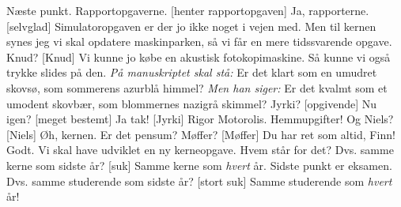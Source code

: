 \documentclass[10pt]{article}
\begin{document}
\begin{sketch}
 Næste punkt. Rapportopgaverne.
 [henter rapportopgaven] Ja, rapporterne.
 [selvglad] Simulatoropgaven er der jo ikke noget i vejen med.
 Men til kernen synes jeg vi skal opdatere maskinparken, så vi
         får en mere tidssvarende opgave. Knud?
 [Knud] Vi kunne jo købe en akustisk fotokopimaskine. Så kunne
         vi også trykke slides på den. \emph{På manuskriptet skal stå:}
         Er det klart som en umudret skovsø, som sommerens azurblå
         himmel? \emph{Men han siger:} Er det kvalmt som et umodent skovbær, som blommernes nazigrå
         skimmel?
 Jyrki?
 [opgivende] Nu igen?
 [meget bestemt] Ja tak!
 [Jyrki] Rigor Motorolis. Hemmupgifter!
 Og Niels?
 [Niels] Øh, kernen. Er det pensum?
 Møffer?
 [Møffer] Du har ret som altid, Finn!
 Godt. Vi skal have udviklet en ny kerneopgave. Hvem står for
         det?
 Dvs. samme kerne som sidste år?
 [suk] Samme kerne som \emph{hvert} år.
 Sidste punkt er eksamen.
 Dvs. samme studerende som sidste år?
 [stort suk] Samme studerende som \emph{hvert} år!


\end{sketch}
\end{document}
